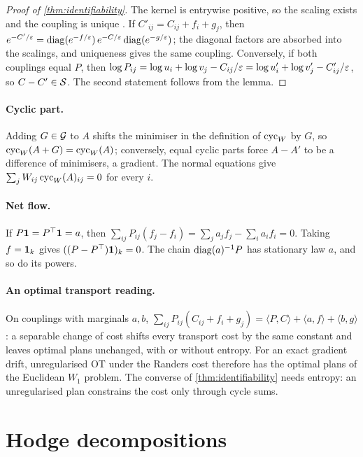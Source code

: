 \begin{proof}[Proof of \cref{thm:identifiability}]
  The kernel is entrywise positive, so the scaling exists and the coupling
  is unique \citep{sinkhorn1967concerning}. If $C'_{ij}=C_{ij}+f_i+g_j$,
  then $e^{-C'/\varepsilon}=\operatorname{diag}(e^{-f/\varepsilon})\,e^{-C/\varepsilon}\operatorname{diag}(e^{-g/\varepsilon})$;
  the diagonal factors are absorbed into the scalings, and uniqueness gives
  the same coupling. Conversely, if both couplings equal $P$, then
  $\log P_{ij}=\log u_i+\log v_j-C_{ij}/\varepsilon=\log u'_i+\log v'_j-C'_{ij}/\varepsilon$,
  so $C-C'\in\mathcal{S}$. The second statement follows from the lemma.
\end{proof}

\paragraph{Cyclic part.}
Adding $G\in\mathcal{G}$ to $A$ shifts the minimiser in the definition of
$\operatorname{cyc}_W$ by $G$, so $\operatorname{cyc}_W(A+G)=\operatorname{cyc}_W(A)$; conversely, equal cyclic parts
force $A-A'$ to be a difference of minimisers, a gradient. The normal
equations give $\sum_jW_{ij}\operatorname{cyc}_W(A)_{ij}=0$ for every $i$.

\paragraph{Net flow.}
If $P\mathbf{1}=P^\top\mathbf{1}=a$, then $\sum_{ij}P_{ij}(f_j-f_i)=\sum_ja_jf_j-\sum_ia_if_i=0$.
Taking $f=\mathbf{1}_k$ gives $((P-P^\top)\mathbf{1})_k=0$. The chain $\operatorname{diag}(a)^{-1}P$ has
stationary law $a$, and so do its powers.

\paragraph{An optimal transport reading.}
On couplings with marginals $a,b$,
$\sum_{ij}P_{ij}(C_{ij}+f_i+g_j)=\langle P,C\rangle+\langle a,f\rangle+\langle b,g\rangle$:
a separable change of cost shifts every transport cost by the same
constant and leaves optimal plans unchanged, with or without entropy.
For an exact gradient drift, unregularised OT under the Randers cost
therefore has the optimal plans of the Euclidean $W_1$ problem. The
converse of \cref{thm:identifiability} needs entropy: an unregularised
plan constrains the cost only through cycle sums.

\section{Hodge decompositions}
\label{app:hodge}

